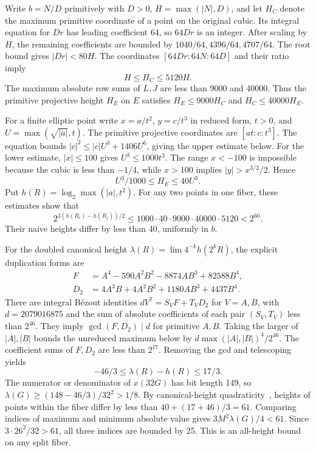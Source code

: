 Write $b=N/D$ primitively with $D>0$, $H=\max(|N|,D)$, and let
$H_C$ denote the maximum primitive coordinate of a point on the
original cubic. Its integral equation for $Dr$ has leading
coefficient 64, so $64Dr$ is an integer. After scaling by $H$, the
remaining coefficients are bounded by $1040/64,4396/64,4707/64$.
The root bound gives $|Dr|<80H$. The coordinates
$[64Dr:64N:64D]$ and their ratio imply
\[
 H\leq H_C\leq5120H.
\]
The maximum absolute row sums of $L,J$ are less than 9000 and
40000. Thus the primitive projective height $H_E$ on $E$ satisfies
$H_E\leq9000H_C$ and $H_C\leq40000H_E$.

For a finite elliptic point write $x=a/t^2$, $y=c/t^3$ in reduced
form, $t>0$, and $U=\max(\sqrt{|a|},t)$. The primitive projective
coordinates are $[at:c:t^3]$. The equation bounds
$|c|^2\leq |c|U^3+1406U^6$, giving the upper estimate below.
For the lower estimate, $|x|\leq100$ gives $U^3\leq1000t^3$.
The range $x<-100$ is impossible because the cubic is less than
$-1/4$, while $x>100$ implies $|y|>x^{3/2}/2$. Hence
\[
 U^3/1000\leq H_E\leq40U^3.
\]
Put $h(R)=\log_2\max(|a|,t^2)$. For any two points in one fiber,
these estimates show that
\[
 2^{3(h(R_i)-h(R_j))/2}
   \leq1000\cdot40\cdot9000\cdot40000\cdot5120<2^{60}.
\]
Their naive heights differ by less than 40, uniformly in $b$.

For the doubled canonical height
$\lambda(R)=\lim4^{-k}h(2^kR)$, the explicit duplication forms are
\[
\begin{aligned}
 F&=A^4-590A^2B^2-8874AB^3+82588B^4,\\
 D_2&=4A^3B+4A^2B^2+1180AB^3+4437B^4.
\end{aligned}
\]
There are integral Bézout identities
$dV^7=S_VF+T_VD_2$ for $V=A,B$, with
$d=2079016875$ and the sum of absolute coefficients of each pair
$(S_V,T_V)$ less than $2^{46}$. They imply
$\gcd(F,D_2)\mid d$ for primitive $A,B$. Taking the larger of
$|A|,|B|$ bounds the unreduced maximum below by
$d\max(|A|,|B|)^4/2^{46}$. The coefficient sums of $F,D_2$ are
less than $2^{17}$. Removing the gcd and telescoping yields
\[
 -46/3\leq\lambda(R)-h(R)\leq17/3.
\]
The numerator or denominator of $x(32G)$ has bit length 149, so
$\lambda(G)\geq(148-46/3)/32^2>1/8$.
By canonical-height quadraticity~\cite[Chapter~VIII, \S9]{Silverman},
heights of points within the fiber differ by
less than $40+(17+46)/3=61$. Comparing indices of maximum and
minimum absolute value gives
$3M^2\lambda(G)/4<61$. Since $3\cdot26^2/32>61$, all three
indices are bounded by 25. This is an all-height bound on any
split fiber.

